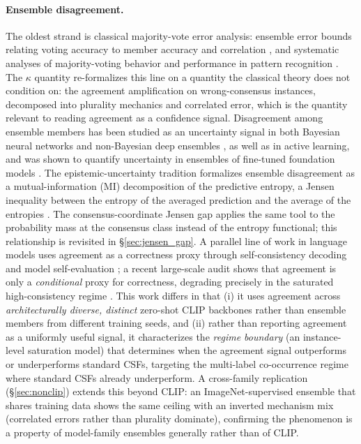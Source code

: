 \documentclass[a4paper,fleqn]{cas-sc}
\begin{document}
\paragraph{Ensemble disagreement.}
The oldest strand is classical majority-vote error analysis: ensemble error bounds relating voting accuracy to member accuracy and correlation \citep{hansen1990neural}, and systematic analyses of majority-voting behavior and performance in pattern recognition \citep{lam1997application}.
The $\kappa$ quantity re-formalizes this line on a quantity the classical theory does not condition on: the agreement amplification on wrong-consensus instances, decomposed into plurality mechanics and correlated error, which is the quantity relevant to reading agreement as a confidence signal.
Disagreement among ensemble members has been studied as an uncertainty signal in both Bayesian neural networks \citep{gal2016dropout} and non-Bayesian deep ensembles \citep{lakshminarayanan2017simple}, as well as in active learning, and was shown to quantify uncertainty in ensembles of fine-tuned foundation models \citep{sun2022ensembles}.
The epistemic-uncertainty tradition formalizes ensemble disagreement as a mutual-information (MI) decomposition of the predictive entropy, a Jensen inequality between the entropy of the averaged prediction and the average of the entropies \citep{houlsby2011bald, smith2018understanding}.
The consensus-coordinate Jensen gap applies the same tool to the probability mass at the consensus class instead of the entropy functional; this relationship is revisited in \S\ref{sec:jensen_gap}.
A parallel line of work in language models uses agreement as a correctness proxy through self-consistency decoding \citep{wang2023selfconsistency} and model self-evaluation \citep{kadavath2022know}; a recent large-scale audit shows that agreement is only a \emph{conditional} proxy for correctness, degrading precisely in the saturated high-consistency regime \citep{ding2026agree}.
This work differs in that (i) it uses agreement across \emph{architecturally diverse, distinct} zero-shot CLIP backbones rather than ensemble members from different training seeds, and (ii) rather than reporting agreement as a uniformly useful signal, it characterizes the \emph{regime boundary} (an instance-level saturation model) that determines when the agreement signal outperforms or underperforms standard CSFs, targeting the multi-label co-occurrence regime where standard CSFs already underperform.
A cross-family replication (\S\ref{sec:nonclip}) extends this beyond CLIP: an ImageNet-supervised ensemble that shares training data shows the same ceiling with an inverted mechanism mix (correlated errors rather than plurality dominate), confirming the phenomenon is a property of model-family ensembles generally rather than of CLIP.
\end{document}
